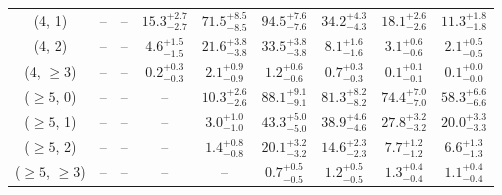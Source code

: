 \begin{table}[h!]
{\begin{tabular}{ccccccccc}
	(4, 1) & -- & -- & $15.3^{+ 2.7 }_{- 2.7 }$ & $71.5^{+ 8.5 }_{- 8.5 }$ & $94.5^{+ 7.6 }_{- 7.6 }$ & $34.2^{+ 4.3 }_{- 4.3 }$ & $18.1^{+ 2.6 }_{- 2.6 }$ & $11.3^{+ 1.8 }_{- 1.8 }$ \\[0.5ex] 
	(4, 2) & -- & -- & $4.6^{+ 1.5 }_{- 1.5 }$ & $21.6^{+ 3.8 }_{- 3.8 }$ & $33.5^{+ 3.8 }_{- 3.8 }$ & $8.1^{+ 1.6 }_{- 1.6 }$ & $3.1^{+ 0.6 }_{- 0.6 }$ & $2.1^{+ 0.5 }_{- 0.5 }$ \\[0.5ex] 
	(4, $\ge3$) & -- & -- & $0.2^{+ 0.3 }_{- 0.3 }$ & $2.1^{+ 0.9 }_{- 0.9 }$ & $1.2^{+ 0.6 }_{- 0.6 }$ & $0.7^{+ 0.3 }_{- 0.3 }$ & $0.1^{+ 0.1 }_{- 0.1 }$ & $0.1^{+ 0.0 }_{- 0.0 }$ \\[0.5ex] 
	($\ge5$, 0) & -- & -- & -- & $10.3^{+ 2.6 }_{- 2.6 }$ & $88.1^{+ 9.1 }_{- 9.1 }$ & $81.3^{+ 8.2 }_{- 8.2 }$ & $74.4^{+ 7.0 }_{- 7.0 }$ & $58.3^{+ 6.6 }_{- 6.6 }$ \\[0.5ex] 
	($\ge5$, 1) & -- & -- & -- & $3.0^{+ 1.0 }_{- 1.0 }$ & $43.3^{+ 5.0 }_{- 5.0 }$ & $38.9^{+ 4.6 }_{- 4.6 }$ & $27.8^{+ 3.2 }_{- 3.2 }$ & $20.0^{+ 3.3 }_{- 3.3 }$ \\[0.5ex] 
	($\ge5$, 2) & -- & -- & -- & $1.4^{+ 0.8 }_{- 0.8 }$ & $20.1^{+ 3.2 }_{- 3.2 }$ & $14.6^{+ 2.3 }_{- 2.3 }$ & $7.7^{+ 1.2 }_{- 1.2 }$ & $6.6^{+ 1.3 }_{- 1.3 }$ \\[0.5ex] 
	($\ge5$, $\ge3$) & -- & -- & -- & -- & $0.7^{+ 0.5 }_{- 0.5 }$ & $1.2^{+ 0.5 }_{- 0.5 }$ & $1.3^{+ 0.4 }_{- 0.4 }$ & $1.1^{+ 0.4 }_{- 0.4 }$ \\[0.5ex] 
	\hline
	\hline
\end{tabular}}
\end{table}
